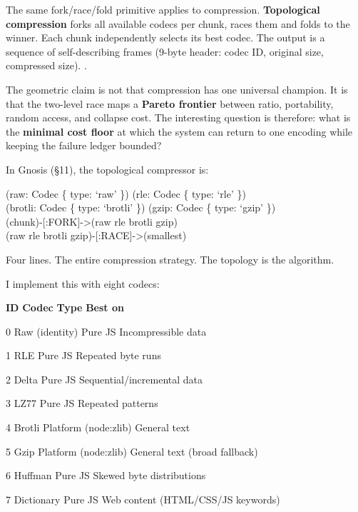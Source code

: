 \documentclass[
]{article}
\begin{document}
The same fork/race/fold primitive applies to compression.
\textbf{Topological compression} forks all available codecs per chunk,
races them and folds to the winner. Each chunk independently selects its
best codec. The output is a sequence of self-describing frames (9-byte
header: codec ID, original size, compressed size). .

The geometric claim is not that compression has one universal champion.
It is that the two-level race maps a \textbf{Pareto frontier} between
ratio, portability, random access, and collapse cost. The interesting
question is therefore: what is the \textbf{minimal cost floor} at which
the system can return to one encoding while keeping the failure ledger
bounded?

In Gnosis (§11), the topological compressor is:

(raw: Codec \{ type: `raw' \}) (rle: Codec \{ type: `rle' \})\\
(brotli: Codec \{ type: `brotli' \}) (gzip: Codec \{ type: `gzip' \})\\
(chunk)-{[}:FORK{]}-\textgreater(raw \textbar{} rle \textbar{} brotli
\textbar{} gzip)\\
(raw \textbar{} rle \textbar{} brotli \textbar{}
gzip)-{[}:RACE{]}-\textgreater(smallest)

Four lines. The entire compression strategy. The topology is the
algorithm.

I implement this with eight codecs:

\textbf{ID} \textbar{} \textbf{Codec} \textbar{} \textbf{Type}
\textbar{} \textbf{Best on} \textbar{}

0 \textbar{} Raw (identity) \textbar{} Pure JS \textbar{} Incompressible
data \textbar{}

1 \textbar{} RLE \textbar{} Pure JS \textbar{} Repeated byte runs
\textbar{}

2 \textbar{} Delta \textbar{} Pure JS \textbar{} Sequential/incremental
data \textbar{}

3 \textbar{} LZ77 \textbar{} Pure JS \textbar{} Repeated patterns
\textbar{}

4 \textbar{} Brotli \textbar{} Platform (node:zlib) \textbar{} General
text \textbar{}

5 \textbar{} Gzip \textbar{} Platform (node:zlib) \textbar{} General
text (broad fallback) \textbar{}

6 \textbar{} Huffman \textbar{} Pure JS \textbar{} Skewed byte
distributions \textbar{}

7 \textbar{} Dictionary \textbar{} Pure JS \textbar{} Web content
(HTML/CSS/JS keywords) \textbar{}
\end{document}
